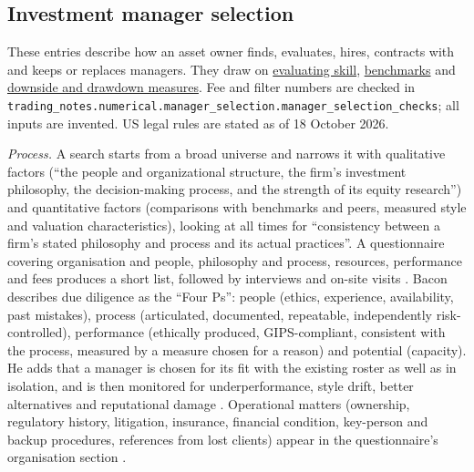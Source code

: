 \subsection{Investment manager selection}

These entries describe how an asset owner finds, evaluates, hires, contracts with and keeps or replaces managers. They draw on \hyperref[meth:manager-skill-evaluation]{evaluating skill}, \hyperref[meth:benchmark-selection-quality]{benchmarks} and \hyperref[meth:downside-appraisal-measures]{downside and drawdown measures}. Fee and filter numbers are checked in \nolinkurl{trading_notes.numerical.manager_selection.manager_selection_checks}; all inputs are invented. US legal rules are stated as of 18 October 2026.

\begin{qfmethod}\label{meth:manager-due-diligence}
 \emph{Process.} A search starts from a broad universe and narrows it with qualitative factors (``the people and organizational structure, the firm's investment philosophy, the decision-making process, and the strength of its equity research'') and quantitative factors (comparisons with benchmarks and peers, measured style and valuation characteristics), looking at all times for ``consistency between a firm's stated philosophy and process and its actual practices''. A questionnaire covering organisation and people, philosophy and process, resources, performance and fees produces a short list, followed by interviews and on-site visits \citep[chap.~7, pp.~466--468]{managing-investment-portfolios-2007}. Bacon describes due diligence as the ``Four Ps'': people (ethics, experience, availability, past mistakes), process (articulated, documented, repeatable, independently risk-controlled), performance (ethically produced, GIPS-compliant, consistent with the process, measured by a measure chosen for a reason) and potential (capacity). He adds that a manager is chosen for its fit with the existing roster as well as in isolation, and is then monitored for underperformance, style drift, better alternatives and reputational damage \citep[3rd ed., 2023, chap.~8, pp.~489--491]{wide-bacon-attribution}. Operational matters (ownership, regulatory history, litigation, insurance, financial condition, key-person and backup procedures, references from lost clients) appear in the questionnaire's organisation section \citep[chap.~7, Example~7-15, pp.~469--470]{managing-investment-portfolios-2007}.


\end{qfmethod}
